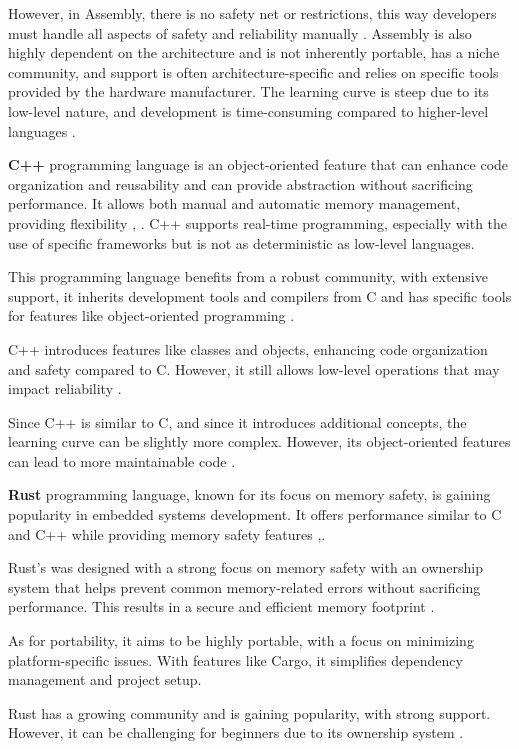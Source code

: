However, in Assembly, there is no safety net or restrictions, this way developers must handle all aspects of safety and reliability manually \cite{LPROG7}.
Assembly is also highly dependent on the architecture and is not inherently portable, has a niche community, and support is often architecture-specific and relies on specific tools provided by the hardware manufacturer.
The learning curve is steep due to its low-level nature, and development is time-consuming compared to higher-level languages \cite{LPROG5}.


\textbf{C++} programming language is an object-oriented feature that can enhance code organization and reusability and can provide abstraction without sacrificing performance.
It allows both manual and automatic memory management, providing flexibility \cite{LPROG2}, \cite{LPROG6}.
C++ supports real-time programming, especially with the use of specific frameworks but is not as deterministic as low-level languages.

This programming language benefits from a robust community, with extensive support, it inherits development tools and compilers from C and has specific tools for features like object-oriented programming \cite{LPROG7}.

C++ introduces features like classes and objects, enhancing code organization and safety compared to C.
However, it still allows low-level operations that may impact reliability \cite{LPROG5}.

Since C++ is similar to C, and since it introduces additional concepts, the learning curve can be slightly more complex.
However, its object-oriented features can lead to more maintainable code \cite{LPROG7}.


\textbf{Rust} programming language, known for its focus on memory safety, is gaining popularity in embedded systems development.
It offers performance similar to C and C++ while providing memory safety features \cite{LPROG2},\cite{LPROG7}.

Rust's was designed with a strong focus on memory safety with an ownership system that helps prevent common memory-related errors without sacrificing performance.
This results in a secure and efficient memory footprint \cite{LPROG2}.

As for portability, it aims to be highly portable, with a focus on minimizing platform-specific issues.
With features like Cargo, it simplifies dependency management and project setup.

Rust has a growing community and is gaining popularity, with strong support.
However, it can be challenging for beginners due to its ownership system \cite{LPROG7}.


